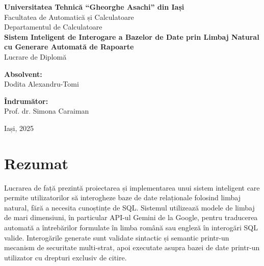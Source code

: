 \documentclass[12pt, a4paper]{report}
\begin{document}
\begin{titlepage}
\centering
\vspace*{1cm}

{\Large\textbf{Universitatea Tehnică ``Gheorghe Asachi'' din Iași}}\\[0.3cm]
{\large Facultatea de Automatică și Calculatoare}\\[0.3cm]
{\large Departamentul de Calculatoare}\\[2.5cm]

{\LARGE\textbf{Sistem Inteligent de Interogare a Bazelor de Date prin Limbaj Natural cu Generare Automată de Rapoarte}}\\[1.5cm]

{\Large Lucrare de Diplomă}\\[3cm]

\begin{minipage}[t]{0.45\textwidth}
\raggedright
{\large\textbf{Absolvent:}}\\
Dodita Alexandru-Tomi
\end{minipage}
\hfill
\begin{minipage}[t]{0.45\textwidth}
\raggedleft
{\large\textbf{Îndrumător:}}\\
Prof. dr. Simona Caraiman
\end{minipage}

\vfill
{\large Iași, 2025}
\end{titlepage}

\tableofcontents
\newpage

\chapter*{Rezumat}

Lucrarea de față prezintă proiectarea și implementarea unui sistem inteligent care permite utilizatorilor să interogheze baze de date relaționale folosind limbaj natural, fără a necesita cunoștințe de SQL. Sistemul utilizează modele de limbaj de mari dimensiuni, în particular API-ul Gemini de la Google, pentru traducerea automată a întrebărilor formulate în limba română sau engleză în interogări SQL valide. Interogările generate sunt validate sintactic și semantic printr-un mecanism de securitate multi-strat, apoi executate asupra bazei de date printr-un utilizator cu drepturi exclusiv de citire.
\end{document}
